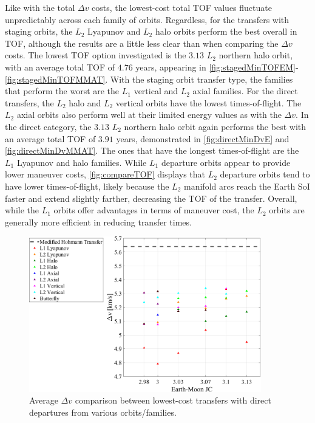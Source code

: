 Like with the total $\Delta v$ costs, the lowest-cost total TOF values fluctuate unpredictably
across each family of orbits. Regardless, for the transfers with staging orbits, the $L_{2}$
Lyapunov and $L_{2}$ halo orbits perform the best overall in TOF, although the results are a little
less clear than when comparing the $\Delta v$ costs. The lowest TOF option investigated is the
$3.13$ $L_{2}$ northern halo orbit, with an average total TOF of $4.76$ years, appearing in
\cref{fig:stagedMinTOFEM}-\cref{fig:stagedMinTOFMMAT}. With the staging orbit transfer type, the
families that perform the worst are the $L_{1}$ vertical and $L_{2}$ axial families. For the direct
transfers, the $L_{2}$ halo and $L_{2}$ vertical orbits have the lowest times-of-flight. The
$L_{2}$ axial orbits also perform well at their limited energy values as with the $\Delta v$. In
the direct category, the $3.13$ $L_{2}$ northern halo orbit again performs the best with an average
total TOF of $3.91$ years, demonstrated in \cref{fig:directMinDvE} and \cref{fig:directMinDvMMAT}.
The ones that have the longest times-of-flight are the $L_{1}$ Lyapunov and halo families. While
$L_{1}$ departure orbits appear to provide lower maneuver costs, \cref{fig:compareTOF} displays
that $L_{2}$ departure orbits tend to have lower times-of-flight, likely because the $L_{2}$
manifold arcs reach the Earth SoI faster and extend slightly farther, decreasing the TOF of the
transfer. Overall, while the $L_{1}$ orbits offer advantages in terms of maneuver cost, the $L_{2}$
orbits are generally more efficient in reducing transfer times.

\begin{figure}[H]
    \centering
    \includegraphics[width=0.9\textwidth]{figures/DeltavComparisonDirect.pdf}
    \caption{Average $\Delta v$ comparison between lowest-cost transfers with direct departures from various orbits/families.}
    \label{fig:compareDeltavDirect}
\end{figure}

